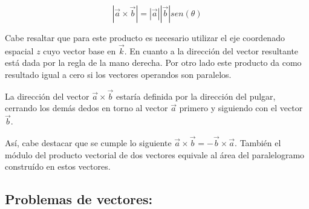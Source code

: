\begin{equation}
 |\vec{a}\times\vec{b}|=|\vec{a}||\vec{b}|sen(\theta)
\end{equation}

Cabe resaltar que para este producto es necesario utilizar el eje coordenado espacial $z$ cuyo vector base en 
$\vec{k}$. En cuanto a la dirección del vector resultante está dada por la regla de la mano derecha. Por otro lado este 
producto da como resultado igual a cero si los vectores operandos son paralelos.

\begin{tcolorbox}
La dirección del vector $\vec{a}\times\vec{b}$ estaría definida por la dirección del pulgar, cerrando los demás dedos en torno al 
vector $\vec{a}$ primero y siguiendo con el vector $\vec{b}$.
\end{tcolorbox}

Así, cabe destacar que se cumple lo siguiente $\vec{a}\times\vec{b}=-\vec{b}\times\vec{a}$. También el módulo del producto 
vectorial de dos vectores equivale al área del paralelogramo construído en estos vectores.

\subsection{Problemas de vectores:}

